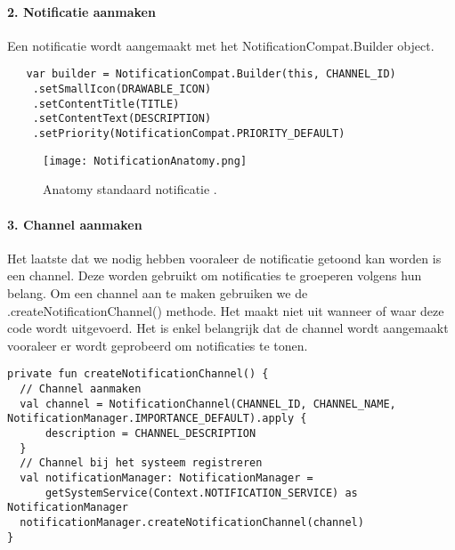 \paragraph{2. Notificatie aanmaken}
Een notificatie wordt aangemaakt met het NotificationCompat.Builder object. 
\begin{verbatim}
   var builder = NotificationCompat.Builder(this, CHANNEL_ID)
    .setSmallIcon(DRAWABLE_ICON)
    .setContentTitle(TITLE)
    .setContentText(DESCRIPTION)
    .setPriority(NotificationCompat.PRIORITY_DEFAULT)
\end{verbatim}
\begin{figure}[H]
    \centering
    \texttt{[image: NotificationAnatomy.png]}
    \caption{Anatomy standaard notificatie .}%
\end{figure}

\paragraph{3. Channel aanmaken}
Het laatste dat we nodig hebben vooraleer de notificatie getoond kan worden is een channel. Deze worden 
gebruikt om notificaties te groeperen volgens hun belang. Om een channel aan te maken gebruiken we 
de .createNotificationChannel() methode. Het maakt niet uit wanneer of waar deze code wordt uitgevoerd. 
Het is enkel belangrijk dat de channel wordt aangemaakt vooraleer er wordt geprobeerd om notificaties 
te tonen.
\begin{verbatim}
private fun createNotificationChannel() {
  // Channel aanmaken
  val channel = NotificationChannel(CHANNEL_ID, CHANNEL_NAME, NotificationManager.IMPORTANCE_DEFAULT).apply {
      description = CHANNEL_DESCRIPTION
  }
  // Channel bij het systeem registreren
  val notificationManager: NotificationManager =
      getSystemService(Context.NOTIFICATION_SERVICE) as NotificationManager
  notificationManager.createNotificationChannel(channel)
}
\end{verbatim}

